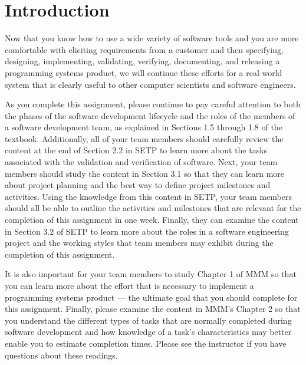 

\usepackage[compact]{titlesec}



\vspace*{-.1in}
\section*{Introduction}

Now that you know how to use a wide variety of software tools and you are more comfortable with eliciting requirements
from a customer and then specifying, designing, implementing, validating, verifying, documenting, and releasing a
programming systems product, we will continue these efforts for a real-world system that is clearly useful to other
computer scientists and software engineers.

As you complete this assignment, please continue to pay careful attention to both the phases of the software development
lifecycle and the roles of the members of a software development team, as explained in Sections 1.5 through 1.8 of the
textbook.  Additionally, all of your team members should carefully review the content at the end of Section 2.2 in SETP
to learn more about the tasks associated with the validation and verification of software.  Next, your team members
should study the content in Section 3.1 so that they can learn more about project planning and the best way to define
project milestones and activities. Using the knowledge from this content in SETP, your team members should all be able
to outline the activities and milestones that are relevant for the completion of this assignment in one week. Finally,
they can examine the content in Section 3.2 of SETP to learn more about the roles in a software engineering project and the
working styles that team members may exhibit during the completion of this assignment.

It is also important for your team members to study Chapter 1 of MMM so that you can learn more about the effort that is
necessary to implement a programming systems product --- the ultimate goal that you should complete for this
assignment. Finally, please examine the content in MMM's Chapter 2 so that you understand the different types of tasks
that are normally completed during software development and how knowledge of a task's characteristics may better enable
you to estimate completion times. Please see the instructor if you have questions about these readings.

